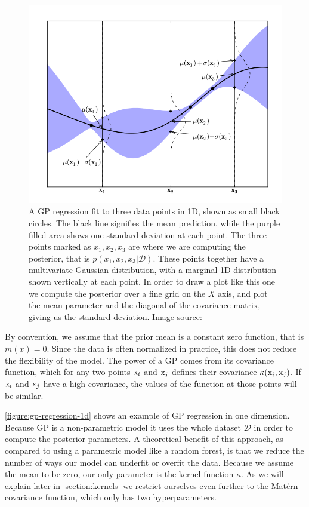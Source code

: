 \begin{figure}
	\begin{center}
		\includegraphics[width=1.0\textwidth]{images/gp-1d.png}
		\caption{A GP regression fit to three data points in 1D, shown as small black circles. The black line signifies the mean prediction, while the purple filled area shows one standard deviation at each point. The three points marked as $x_1, x_2, x_3$ are where we are computing the posterior, that is $p(x_1, x_2, x_3 | \mathcal{D})$. These points together have a multivariate Gaussian distribution, with a marginal 1D distribution shown vertically at each point. In order to draw a plot like this one we compute the posterior over a fine grid on the $X$ axis, and plot the mean parameter and the diagonal of the covariance matrix, giving us the standard deviation. Image source: \cite{nando-bopt-tutorial}}
	\end{center}
\end{figure}
\label{figure:gp-regression-1d}


By convention, we assume that the prior mean is a constant zero function, that
is $m(x) = 0$. Since the data is often normalized in practice, this does not
reduce the flexibility of the model. The power of a GP comes from its
covariance function, which for any two points ${\textnormal{x}}_i$ and ${\textnormal{x}}_j$ defines their
covariance $\kappa({\textnormal{x}}_i, {\textnormal{x}}_j)$. If ${\textnormal{x}}_i$ and ${\textnormal{x}}_j$ have a high covariance,
the values of the function at those points will be similar.

\autoref{figure:gp-regression-1d} shows an example of GP regression in one dimension. Because GP is a non-parametric model it uses the whole dataset $\mathcal{D}$ in order to compute the posterior parameters. A theoretical benefit of this approach, as compared to using a parametric model like a random forest, is that we reduce the number of ways our model can underfit or overfit the data. Because we assume the mean to be zero, our only parameter is the kernel function $\kappa$. As we will explain later in \autoref{section:kernels} we restrict ourselves even further to the Mat\'ern covariance function, which only has two hyperparameters.


